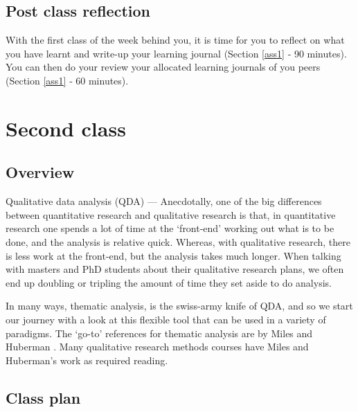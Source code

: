 \documentclass[]{book}
\theoremstyle{definition}
\theoremstyle{definition}
\theoremstyle{definition}
\theoremstyle{remark}
\begin{document}
\hypertarget{post-class-reflection-4}{%
\subsection{Post class reflection}\label{post-class-reflection-4}}

With the first class of the week behind you, it is time for you to
reflect on what you have learnt and write-up your learning journal
(Section \ref{ass1} ‐ 90 minutes). You can then do your review your
allocated learning journals of you peers (Section \ref{ass1} ‐ 60
minutes).

\hypertarget{second-class-2}{%
\section*{Second class}\label{second-class-2}}

\hypertarget{overview-5}{%
\subsection*{Overview}\label{overview-5}}

Qualitative data analysis (QDA) --- Anecdotally, one of the big
differences between quantitative research and qualitative research is
that, in quantitative research one spends a lot of time at the
`front-end' working out what is to be done, and the analysis is relative
quick. Whereas, with qualitative research, there is less work at the
front-end, but the analysis takes much longer. When talking with masters
and PhD students about their qualitative research plans, we often end up
doubling or tripling the amount of time they set aside to do analysis.

In many ways, thematic analysis, is the swiss-army knife of QDA, and so
we start our journey with a look at this flexible tool that can be used
in a variety of paradigms. The `go-to' references for thematic analysis
are by Miles and Huberman
\autocites{miles_1994_qualitativedataanalysis}{huberman_2002_qualitativeresearchercompanion}.
Many qualitative research methods courses have Miles and Huberman's work
as required reading.

\hypertarget{class-plan-5}{%
\subsection*{Class plan}\label{class-plan-5}}
\end{document}
